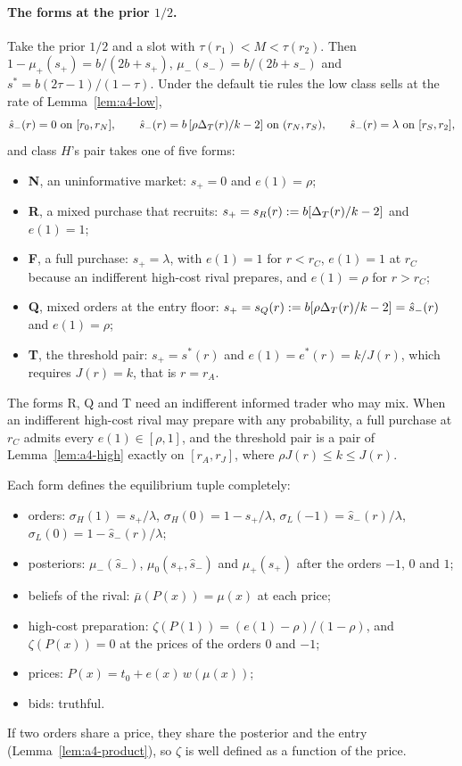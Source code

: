 \paragraph{The forms at the prior \(1/2\).}
Take the prior \(1/2\) and a slot with \(\tau(r_1)<M<\tau(r_2)\). Then \(1-\mu_+(s_+)=b/(2b+s_+)\),
\(\mu_-(s_-)=b/(2b+s_-)\) and \(s^*=b(2\tau-1)/(1-\tau)\). Under the default tie rules the low class sells at the rate
of Lemma~\ref{lem:a4-low},
\[
\hat s_-(r)=0\ \text{on}\ [r_0,r_N],\qquad \hat s_-(r)=b\,[\rho\Delta_T(r)/k-2]\ \text{on}\ (r_N,r_S),\qquad
\hat s_-(r)=\lambda\ \text{on}\ [r_S,r_2],
\]
and class \(H\)'s pair takes one of five forms:
\begin{itemize}[leftmargin=2em]
\item \textbf{N}, an uninformative market: \(s_+=0\) and \(e(1)=\rho\);
\item \textbf{R}, a mixed purchase that recruits: \(s_+=s_R(r):=b[\Delta_T(r)/k-2]\) and \(e(1)=1\);
\item \textbf{F}, a full purchase: \(s_+=\lambda\), with \(e(1)=1\) for \(r<r_C\), \(e(1)=1\) at \(r_C\) because an
indifferent high-cost rival prepares, and \(e(1)=\rho\) for \(r>r_C\);
\item \textbf{Q}, mixed orders at the entry floor: \(s_+=s_Q(r):=b[\rho\Delta_T(r)/k-2]=\hat s_-(r)\) and \(e(1)=\rho\);
\item \textbf{T}, the threshold pair: \(s_+=s^*(r)\) and \(e(1)=e^*(r)=k/J(r)\), which requires \(J(r)=k\), that is
\(r=r_A\).
\end{itemize}
The forms R, Q and T need an indifferent informed trader who may mix. When an indifferent high-cost rival may prepare
with any probability, a full purchase at \(r_C\) admits every \(e(1)\in[\rho,1]\), and the threshold pair is a pair of
Lemma~\ref{lem:a4-high} exactly on \([r_A,r_J]\), where \(\rho J(r)\le k\le J(r)\).

Each form defines the equilibrium tuple completely:
\begin{itemize}[leftmargin=2em]
\item orders: \(\sigma_H(1)=s_+/\lambda\), \(\sigma_H(0)=1-s_+/\lambda\), \(\sigma_L(-1)=\hat s_-(r)/\lambda\),
\(\sigma_L(0)=1-\hat s_-(r)/\lambda\);
\item posteriors: \(\mu_-(\hat s_-)\), \(\mu_0(s_+,\hat s_-)\) and \(\mu_+(s_+)\) after the orders \(-1\), \(0\) and \(1\);
\item beliefs of the rival: \(\bar\mu(P(x))=\mu(x)\) at each price;
\item high-cost preparation: \(\zeta(P(1))=(e(1)-\rho)/(1-\rho)\), and \(\zeta(P(x))=0\) at the prices of the
orders \(0\) and \(-1\);
\item prices: \(P(x)=t_0+e(x)\,w(\mu(x))\);
\item bids: truthful.
\end{itemize}
If two orders share a price, they share the posterior and the entry (Lemma~\ref{lem:a4-product}), so \(\zeta\) is
well defined as a function of the price.


